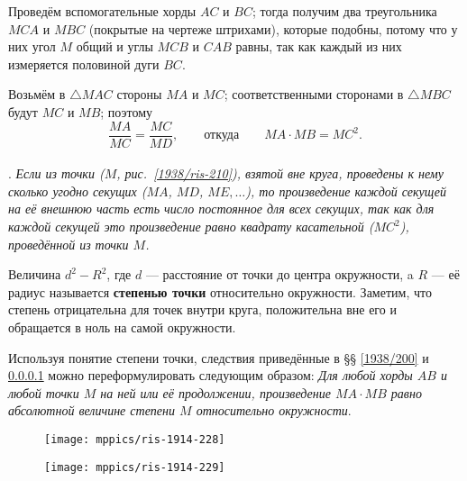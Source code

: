 Проведём вспомогательные хорды $AC$ и $BC$;
тогда получим два треугольника $MCA$ и $MBC$ (покрытые на чертеже штрихами), которые подобны, потому что у них угол $M$ общий и углы $MCB$ и $CAB$ равны, так как каждый из них измеряется половиной дуги $BC$.


Возьмём в $\triangle MAC$ стороны $MA$ и $MC$;
соответственными сторонами в $\triangle MBC$ будут $MC$ и $MB$;
поэтому
\[\frac{MA}{MC} = \frac{MC}{MD},
\qquad\text{откуда}\qquad
MA\cdot MB=MC^2.\]

{\small

\paragraph{}\label{1938/202}
\mbox{.}
\emph{Если из точки \emph{($M$, рис.~\ref{1938/ris-210}),} взятой вне круга, проведены к нему сколько угодно секущих ($MA$, $MD$, $ME,\dots$), то произведение каждой секущей на её внешнюю часть есть число постоянное для всех секущих, так как для каждой секущей это произведение равно квадрату касательной ($MC^2$), проведённой из точки $M$.}


Величина $d^2- R^2$, где $d$ — расстояние от точки до центра окружности, a $R$ — её радиус называется \textbf{степенью точки} относительно окружности.
Заметим, что степень отрицательна для точек внутри круга,
положительна вне его и обращается в ноль на самой окружности.

Используя понятие степени точки, следствия приведённые в §§ \ref{1938/200} и \ref{1938/202} можно переформулировать следующим образом:
\emph{Для любой хорды $AB$ и любой точки $M$ на ней или её продолжении, произведение
$MA\cdot MB$
равно абсолютной величине степени $M$ относительно окружности}.


\begin{figure}[!ht]
\begin{minipage}{.48\textwidth}
\centering
\texttt{[image: mppics/ris-1914-228]}
\end{minipage}
\hfill
\begin{minipage}{.48\textwidth}
\centering
\texttt{[image: mppics/ris-1914-229]}
\end{minipage}

\medskip

\begin{minipage}{.48\textwidth}
\centering
\caption{}\label{1914/ris-228}
\end{minipage}
\hfill
\begin{minipage}{.48\textwidth}
\centering
\caption{}\label{1914/ris-229}
\end{minipage}
\vskip-4mm
\end{figure}

}
